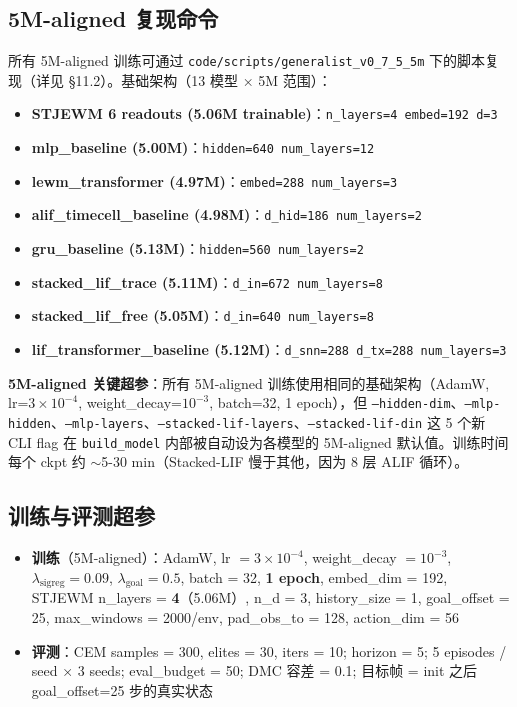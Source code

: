 \documentclass[11pt,a4paper]{article}
\begin{document}
\subsection{5M-aligned 复现命令}

所有 5M-aligned 训练可通过 \texttt{code/scripts/generalist\_v0\_7\_5\_5m} 下的脚本复现（详见 §11.2）。基础架构（13 模型 × 5M 范围）：

\begin{itemize}[leftmargin=2em]
    \item \textbf{STJEWM 6 readouts (5.06M trainable)}：\texttt{n\_layers=4 embed=192 d=3}
    \item \textbf{mlp\_baseline (5.00M)}：\texttt{hidden=640 num\_layers=12}
    \item \textbf{lewm\_transformer (4.97M)}：\texttt{embed=288 num\_layers=3}
    \item \textbf{alif\_timecell\_baseline (4.98M)}：\texttt{d\_hid=186 num\_layers=2}
    \item \textbf{gru\_baseline (5.13M)}：\texttt{hidden=560 num\_layers=2}
    \item \textbf{stacked\_lif\_trace (5.11M)}：\texttt{d\_in=672 num\_layers=8}
    \item \textbf{stacked\_lif\_free (5.05M)}：\texttt{d\_in=640 num\_layers=8}
    \item \textbf{lif\_transformer\_baseline (5.12M)}：\texttt{d\_snn=288 d\_tx=288 num\_layers=3}
\end{itemize}

\textbf{5M-aligned 关键超参}：所有 5M-aligned 训练使用相同的基础架构（AdamW, lr=$3\times 10^{-4}$, weight\_decay=$10^{-3}$, batch=32, 1 epoch），但 \texttt{--hidden-dim}、\texttt{--mlp-hidden}、\texttt{--mlp-layers}、\texttt{--stacked-lif-layers}、\texttt{--stacked-lif-din} 这 5 个新 CLI flag 在 \texttt{build\_model} 内部被自动设为各模型的 5M-aligned 默认值。训练时间每个 ckpt 约 $\sim$5-30 min（Stacked-LIF 慢于其他，因为 8 层 ALIF 循环）。

\subsection{训练与评测超参}

\begin{itemize}[leftmargin=2em]
    \item \textbf{训练}（5M-aligned）：AdamW, lr $= 3 \times 10^{-4}$, weight\_decay $= 10^{-3}$, $\lambda_\text{sigreg} = 0.09$, $\lambda_\text{goal} = 0.5$, batch = 32, \textbf{1 epoch}, embed\_dim = 192, STJEWM n\_layers = \textbf{4}（5.06M）, n\_d = 3, history\_size = 1, goal\_offset = 25, max\_windows = 2000/env, pad\_obs\_to = 128, action\_dim = 56
    \item \textbf{评测}：CEM samples = 300, elites = 30, iters = 10; horizon = 5; 5 episodes / seed × 3 seeds; eval\_budget = 50; DMC 容差 = 0.1; 目标帧 = init 之后 goal\_offset=25 步的真实状态
\end{itemize}
\end{document}
